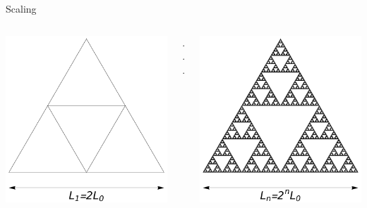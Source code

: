 \documentclass[xcolor=x11names,compress,professionalfonts]{beamer}
\renewcommand{\(}{\begin{columns}}
\renewcommand{\)}{\end{columns}}
\newcommand{\<}[1]{\begin{column}{#1}}
\renewcommand{\>}{\end{column}}
\begin{document}
\begin{frame}{Scaling}
\begin{itemize}
\begin{columns}
  \begin{column}{3cm}
  	\centering
     \includegraphics[scale=\s]{scale1.pdf}
  \end{column}
  
  \begin{column}{1cm}
  \centering
  ...
  \end{column}
  
    \begin{column}{3cm}
    \centering
    \includegraphics[scale=\s]{scaleInfty.pdf}
  \end{column}
\end{columns}


\end{itemize}
\end{frame}
\end{document}
